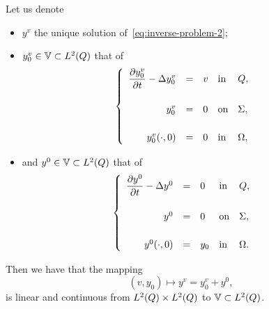 \begin{remarque}%
    Let us denote
    \begin{itemize}
        \item $y^{v}$ the unique solution of~\eqref{eq:inverse-problem-2};
        \item $y_{0}^{v}\in \mathbb{V} \subset L^{2}\!\left({Q}\right)$ that of
            \begin{equation*}\label{eq:null-initial-condition}
                \begin{cases}\displaystyle
                    \begin{array}{rclll}
                        \dfrac{\partial{}y_{0}^{v}}{\partial{}t} - \Delta y_{0}^{v} & = & v &
                        \text{in} & Q,\\
                        \\
                        y_{0}^{v} & = & 0 & \text{on} & \Sigma,\\
                        \\
                        y_{0}^{v}\!\left({\cdot,0}\right) & = & 0 &
                        \text{in} & \Omega,
                    \end{array}
                \end{cases}
            \end{equation*}
        \item and $y^{0}\in \mathbb{V} \subset L^{2}\!\left({Q}\right)$ that of
            \begin{equation}\label{eq:null-source-term}
                \begin{cases}\displaystyle
                    \begin{array}{rclll}
                        \dfrac{\partial{}y^{0}}{\partial{}t} - \Delta y^{0} & = & 0 &
                        \text{in} & Q,\\
                        \\
                        y^{0} & = & 0 & \text{on} & \Sigma,\\
                        \\
                        y^{0}\!\left({\cdot,0}\right) & = & y_{0} &
                        \text{in} & \Omega.
                    \end{array}
                \end{cases}
            \end{equation}
    \end{itemize}
    Then we have that the mapping
    \begin{equation*}
        \left({v,y_{0}}\right)\longmapsto y^{v} = y_{0}^{v} + y^{0},
    \end{equation*}
    is linear and continuous from $L^{2}\!\left({Q}\right)\times L^{2}\!\left({Q}\right)$ to $\mathbb{V}\subset
    L^{2}\!\left({Q}\right)$.


\end{remarque}
